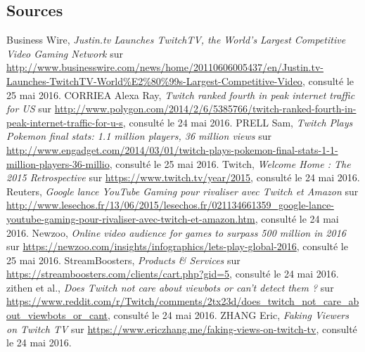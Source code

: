 \documentclass[a4paper]{article}
\begin{document}
\subsection{Sources}
\begin{flushleft}
\begin{thebibliography}{10}	
      Business Wire, \textit{Justin.tv Launches TwitchTV, the World’s Largest Competitive Video Gaming Network} sur \url{http://www.businesswire.com/news/home/20110606005437/en/Justin.tv-Launches-TwitchTV-World\%E2\%80\%99s-Largest-Competitive-Video}, consulté le 25 mai 2016.
      CORRIEA Alexa Ray, \textit{Twitch ranked fourth in peak internet traffic for US} sur \url{http://www.polygon.com/2014/2/6/5385766/twitch-ranked-fourth-in-peak-internet-traffic-for-u-s}, consulté le 24 mai 2016.
      PRELL Sam, \textit{Twitch Plays Pokemon final stats: 1.1 million players, 36 million views} sur \url{http://www.engadget.com/2014/03/01/twitch-plays-pokemon-final-stats-1-1-million-players-36-millio}, consulté le 25 mai 2016.
     Twitch, \textit{Welcome Home : The 2015 Retrospective} sur \url{https://www.twitch.tv/year/2015}, consulté le 24 mai 2016.
     Reuters, \textit{Google lance YouTube Gaming pour rivaliser avec Twitch et Amazon} sur \url{http://www.lesechos.fr/13/06/2015/lesechos.fr/021134661359_google-lance-youtube-gaming-pour-rivaliser-avec-twitch-et-amazon.htm}, consulté le 24 mai 2016.
     Newzoo, \textit{Online video audience for games to surpass 500 million in 2016} sur \url{https://newzoo.com/insights/infographics/lets-play-global-2016}, consulté le 25 mai 2016.     
     StreamBoosters, \textit{Products \& Services} sur \url{https://streamboosters.com/clients/cart.php?gid=5}, consulté le 24 mai 2016.
     zithen et al., \textit{Does Twitch not care about viewbots or can't detect them ?} sur \url{https://www.reddit.com/r/Twitch/comments/2tx23d/does_twitch_not_care_about_viewbots_or_cant}, consulté le 24 mai 2016.
     ZHANG Eric, \textit{Faking Viewers on Twitch TV} sur \url{https://www.ericzhang.me/faking-views-on-twitch-tv}, consulté le 24 mai 2016.
\end{thebibliography}
\end{flushleft}
\end{document}
